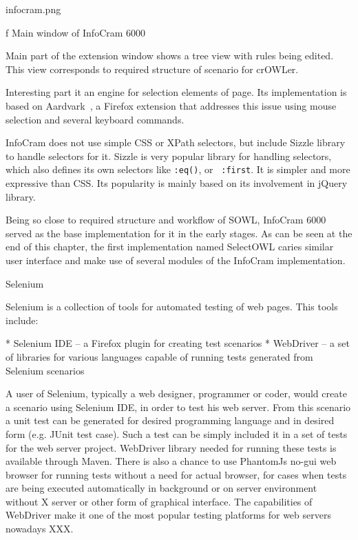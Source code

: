 \midinsert
\picw=7cm \cinspic infocram.png
\caption/f Main window of InfoCram 6000
\endinsert

Main part of the extension window shows a tree view with rules being edited.
This view corresponds to required structure of scenario for crOWLer. 

Interesting part it an engine for selection elements of page. Its
implementation is based on
Aardvark~, a
Firefox extension that addresses this issue using mouse selection and several
keyboard commands. 

InfoCram does not use simple CSS or XPath selectors, but include Sizzle library
to handle selectors for it. Sizzle is very popular library for handling
selectors, which also defines its own selectors like {\tt :eq()}, or {\tt
:first}. It is simpler and more expressive than CSS. Its popularity is 
mainly based on its involvement in jQuery library. 

Being so close to required structure and workflow of SOWL, InfoCram 6000 served
as the base implementation for it in the early stages. As can be seen at the end 
of this chapter, the first implementation named SelectOWL caries similar user
interface and make use of several modules of the InfoCram implementation. 


\secc Selenium

Selenium is a collection of tools for automated testing of web pages. This tools include: 

\begitems
  * Selenium IDE -- a Firefox plugin for creating test scenarios
  * WebDriver -- a set of libraries for various languages capable of running
    tests generated from Selenium scenarios
\enditems

A user of Selenium, typically a web designer, programmer or coder, would create
a scenario using Selenium IDE, in order to test his web server. From this
scenario a unit test can be generated for desired programming language and in
desired form (e.g. JUnit test case). Such a test can be simply included it in a
set of tests for the web server project. WebDriver library needed for running
these tests is available through Maven. There is also a chance to use PhantomJs
no-gui web browser for running tests without a need for actual browser, for
cases when tests are being executed automatically in background or on server
environment without X server or other form of graphical interface. The
capabilities of WebDriver make it one of the most popular testing platforms for
web servers nowadays XXX. 

